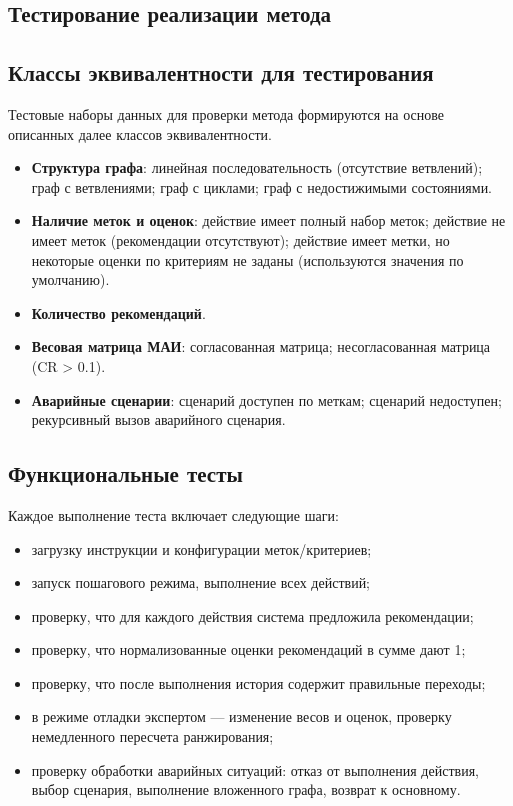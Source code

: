 \clearpage

\subsection{Тестирование реализации метода}

\subsection*{Классы эквивалентности для тестирования}

Тестовые наборы данных для проверки метода формируются на основе описанных далее классов эквивалентности.

\begin{itemize}
    \item \textbf{Структура графа}: линейная последовательность (отсутствие ветвлений); граф с ветвлениями; граф с циклами; граф с недостижимыми состояниями.
    \item \textbf{Наличие меток и оценок}: действие имеет полный набор меток; действие не имеет меток (рекомендации отсутствуют); действие имеет метки, но некоторые оценки по критериям не заданы (используются значения по умолчанию).
    \item \textbf{Количество рекомендаций}.
    \item \textbf{Весовая матрица МАИ}: согласованная матрица; несогласованная матрица (CR > 0.1).
    \item \textbf{Аварийные сценарии}: сценарий доступен по меткам; сценарий недоступен; рекурсивный вызов аварийного сценария.
\end{itemize}

\subsection*{Функциональные тесты}

Каждое выполнение теста включает следующие шаги:

\begin{itemize}
    \item загрузку инструкции и конфигурации меток/критериев;
    \item запуск пошагового режима, выполнение всех действий;
    \item проверку, что для каждого действия система предложила рекомендации;
    \item проверку, что нормализованные оценки рекомендаций в сумме дают 1;
    \item проверку, что после выполнения история содержит правильные переходы;
    \item в режиме отладки экспертом --- изменение весов и оценок, проверку немедленного пересчета ранжирования;
    \item проверку обработки аварийных ситуаций: отказ от выполнения действия, выбор сценария, выполнение вложенного графа, возврат к основному.
\end{itemize}

